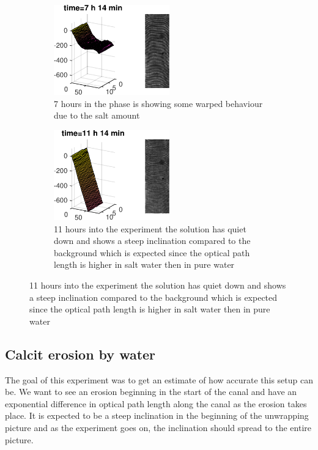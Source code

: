 \begin {figure}[ht!]
\begin {subfigure}[h]{0.35\textwidth}
\includegraphics [width=5cm]{bilder/diff202.pdf}
\caption {7 hours in the phase is showing some warped behaviour due to the salt amount}
\end {subfigure}
\hfill
\begin {subfigure}[h]{0.35\textwidth}
\includegraphics [width=5cm]{bilder/diff302.pdf}
\caption {11 hours into the experiment the solution has quiet down and shows a
steep inclination compared to the background which is expected since the optical
path length is higher in salt water then in pure water}
\end {subfigure}
\end {figure}

\subsection {Calcit erosion by water}

The goal of this experiment was to get an estimate of how accurate this setup can be.
We want to see an erosion beginning in the start of the canal and have an exponential
difference in optical path length along the canal as the erosion takes place.
It is expected to be a steep inclination in the beginning of the unwrapping picture
and as the experiment goes on, the inclination should spread to the entire picture.

